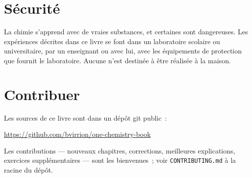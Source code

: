 \section*{Sécurité}

La chimie s'apprend avec de vraies substances, et certaines sont
dangereuses. Les expériences décrites dans ce livre se font dans un
laboratoire scolaire ou universitaire, par un enseignant ou avec lui,
avec les équipements de protection que fournit le laboratoire. Aucune
n'est destinée à être réalisée à la maison.

\section*{Contribuer}

Les sources de ce livre sont dans un dépôt git public~:
\begin{center}
\url{https://github.com/bvirrion/one-chemistry-book}
\end{center}
Les contributions --- nouveaux chapitres, corrections, meilleures
explications, exercices supplémentaires --- sont les bienvenues~; voir
\texttt{CONTRIBUTING.md} à la racine du dépôt.
